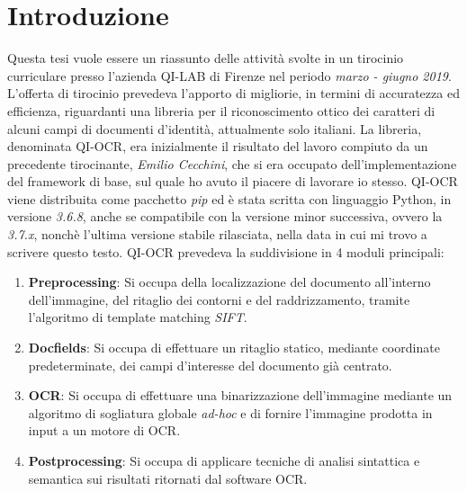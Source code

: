 \chapter*{Introduzione}

Questa tesi vuole essere un riassunto delle attivit\`a svolte in un tirocinio curriculare presso l'azienda QI-LAB di Firenze nel periodo \textit{marzo - giugno 2019}. L'offerta di tirocinio prevedeva l'apporto di migliorie, in termini di accuratezza ed efficienza, riguardanti una libreria per il riconoscimento ottico dei caratteri di alcuni campi di documenti d'identit\`a, attualmente solo italiani. La libreria, denominata QI-OCR, era inizialmente il risultato del lavoro compiuto da un precedente tirocinante, \textit{Emilio Cecchini}, che si era occupato dell'implementazione del framework di base, sul quale ho avuto il piacere di lavorare io stesso. QI-OCR viene distribuita come pacchetto \textit{pip} ed \`e stata scritta con linguaggio Python, in versione \textit{3.6.8}, anche se compatibile con la versione minor successiva, ovvero la \textit{3.7.x}, nonch\`e l'ultima versione stabile rilasciata, nella data in cui mi trovo a scrivere questo testo. QI-OCR prevedeva la suddivisione in 4 moduli principali:
\begin{enumerate}
	\item \textbf{Preprocessing}: Si occupa della localizzazione del documento all'interno dell'immagine, del ritaglio dei contorni e del raddrizzamento, tramite l'algoritmo di template matching \textit{SIFT}.
	\item \textbf{Docfields}: Si occupa di effettuare un ritaglio statico, mediante coordinate predeterminate, dei campi d'interesse del documento gi\`a centrato.
	\item \textbf{OCR}: Si occupa di effettuare una binarizzazione dell'immagine mediante un algoritmo di sogliatura globale \textit{ad-hoc} e di fornire l'immagine prodotta in input a un motore di OCR.
	\item \textbf{Postprocessing}: Si occupa di applicare tecniche di analisi sintattica e semantica sui risultati ritornati dal software OCR.
\end{enumerate}
